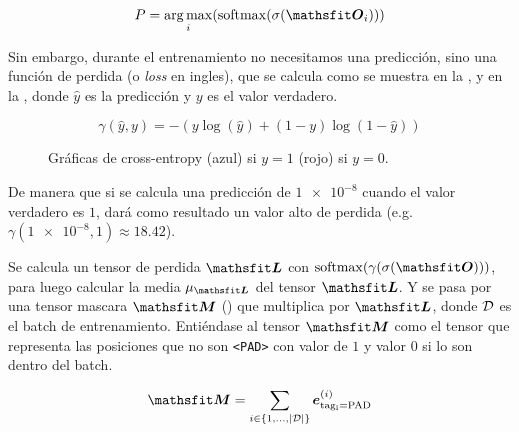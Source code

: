 \begin{equation} \label{eq:bilstm-pred}
  P = \argmax_i (\softmax(\sigmoid(\tO_i)))
\end{equation}

Sin embargo, durante el entrenamiento no necesitamos una predicción, sino una función de perdida (o \emph{loss} en ingles), que se calcula como se muestra en la , y en la , donde $\hat{y}$ es la predicción y $y$ es el valor verdadero.

\begin{equation} \label{eq:cross-entropy-loss}
  \gamma(\hat{y}, y) = -{(y\log(\hat{y}) + (1 - y)\log(1 - \hat{y}))}
\end{equation}

\begin{figure}[H]
  \centering
\decoRule
\caption[Gráficas de cross-entropy]{Gráficas de cross-entropy (azul) si $y = 1$ (rojo) si $y = 0$.}
\label{fig:cross-entropy-y1}
\end{figure}

De manera que si se calcula una predicción de $\num{1e-8}$ cuando el valor verdadero es $1$, dará como resultado un valor alto de perdida (e.g. $\gamma(\num{1e-8}, 1) \approx \num{18.42}$).

Se calcula un tensor de perdida $\tL$ con $\softmax(\gamma(\sigmoid(\tO)))$, para luego calcular la media $\mu_{\tL}$ del tensor $\tL$. Y se pasa por una tensor mascara $\tM$ () que multiplica por $\tL$, donde $\mathcal{D}$ es el batch de entrenamiento. Entiéndase al tensor $\tM$ como el tensor que representa las posiciones que no son \texttt{<PAD>} con valor de $1$ y valor $0$ si lo son dentro del batch.

\begin{equation} \label{eq:bilstm-mask-tensor}
  \tM = \sum_{i \in \{1, \ldots, |\train|\}} \ve_{\mathrm{tag_i = \mathrm{PAD}}}^{(i)}
\end{equation}

